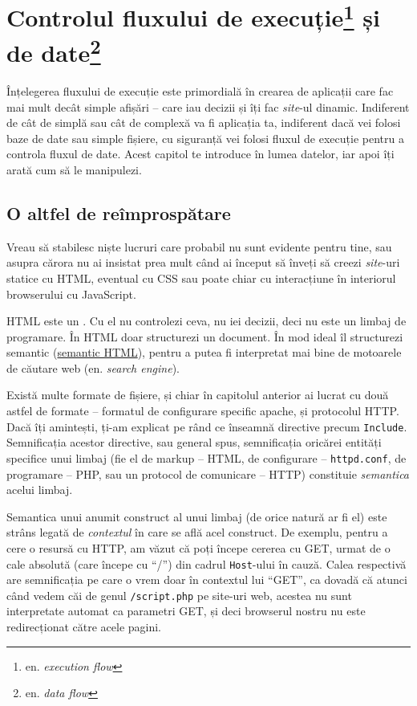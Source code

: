 \chapter[Controlul fluxului de execuție și de date]{Controlul
fluxului de execuție\footnote{en.
\textsl{execution flow}} și de date\footnote{en.
\textsl{data flow}}}

\begin{chapsummary}
Înțelegerea fluxului de execuție este primordială
în crearea de aplicații care fac mai mult decât simple
afișări -- care iau decizii și îți fac \textsl{site}-ul dinamic.
Indiferent de cât de simplă sau cât de complexă va fi aplicația ta,
indiferent dacă vei folosi baze de date sau simple fișiere,
cu siguranță vei folosi fluxul de execuție pentru a controla
fluxul de date. Acest capitol te introduce în lumea datelor,
iar apoi îți arată cum să le manipulezi.
\end{chapsummary}

\section{O altfel de reîmprospătare}

Vreau să stabilesc niște lucruri care probabil nu sunt evidente
pentru tine, sau asupra cărora nu ai insistat prea mult
când ai început să înveți să creezi \textit{site}-uri statice
cu HTML, eventual cu CSS sau poate chiar cu interacțiune
în interiorul browserului cu JavaScript.

HTML este un .
Cu el nu controlezi ceva, nu iei decizii, deci nu este
un limbaj de programare. În HTML doar
structurezi un document. În mod ideal îl structurezi
semantic (\href{http://en.wikipedia.org/wiki/Semantic_HTML}{semantic HTML}),
pentru a putea fi interpretat mai bine de motoarele de căutare web
(en. \textsl{search engine}).

Există multe formate de fișiere, și chiar în capitolul anterior ai
lucrat cu două astfel de formate -- formatul de configurare specific apache, și protocolul
HTTP. Dacă îți amintești,
ți-am explicat pe rând ce înseamnă directive precum \texttt{Include}.
Semnificația acestor directive, sau general spus, semnificația oricărei
entități specifice unui limbaj (fie el de markup -- HTML, de configurare
-- \texttt{httpd.conf}, de programare -- PHP, sau un protocol de
comunicare -- HTTP) constituie \textsl{semantica}
acelui limbaj.

Semantica unui anumit construct al unui limbaj (de orice natură
ar fi el) este strâns legată de \textit{contextul} în care se află acel
construct.
De exemplu, pentru a cere o resursă cu HTTP, am văzut că
poți începe cererea cu GET, urmat
de o cale absolută (care începe cu ``/'') din cadrul \texttt{Host}-ului
în cauză. Calea respectivă are semnificația pe care o vrem
doar în contextul lui ``GET'', ca dovadă că atunci când vedem
căi de genul \texttt{/script.php} pe site-uri web,
acestea nu sunt interpretate automat ca parametri GET, și
deci browserul nostru nu este redirecționat către acele pagini.


